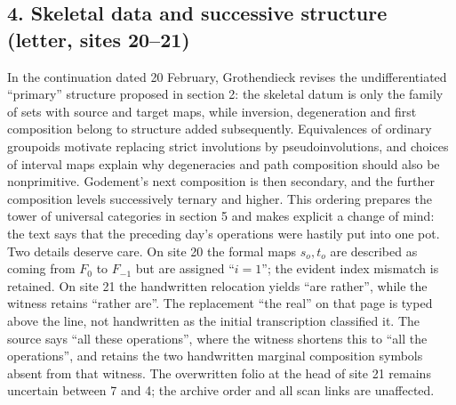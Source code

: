 \documentclass[10pt,oneside]{book}
\begin{document}
\subsection*{4. Skeletal data and successive structure (letter, sites 20--21)}
In the continuation dated 20 February, Grothendieck revises the undifferentiated ``primary'' structure proposed in section 2: the skeletal datum is only the family of sets with source and target maps, while inversion, degeneration and first composition belong to structure added subsequently. Equivalences of ordinary groupoids motivate replacing strict involutions by pseudoinvolutions, and choices of interval maps explain why degeneracies and path composition should also be nonprimitive. Godement's next composition is then secondary, and the further composition levels successively ternary and higher. This ordering prepares the tower of universal categories in section 5 and makes explicit a change of mind: the text says that the preceding day's operations were hastily put into one pot. Two details deserve care. On site 20 the formal maps $s_o,t_o$ are described as coming from $F_0$ to $F_{-1}$ but are assigned ``$i=1$''; the evident index mismatch is retained. On site 21 the handwritten relocation yields ``are rather'', while the witness retains ``rather are''. The replacement ``the real'' on that page is typed above the line, not handwritten as the initial transcription classified it. The source says ``all these operations'', where the witness shortens this to ``all the operations'', and retains the two handwritten marginal composition symbols absent from that witness. The overwritten folio at the head of site 21 remains uncertain between 7 and 4; the archive order and all scan links are unaffected.
\end{document}
